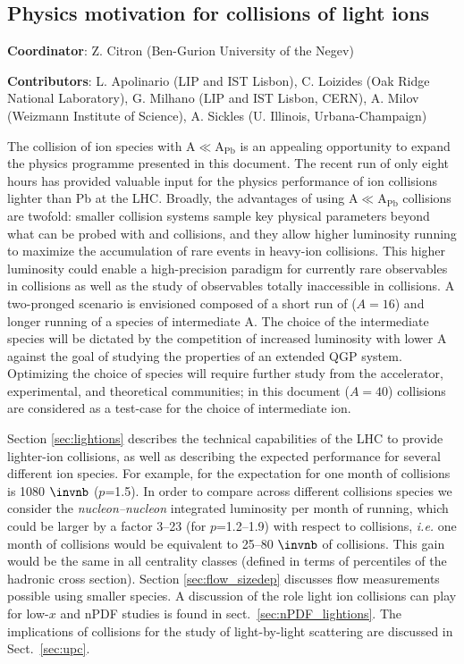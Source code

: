 \subsection{Physics motivation for collisions of light ions}
\label{sec:smallAsum}
{ \small
\noindent \textbf{Coordinator}: Z. Citron (Ben-Gurion University of the Negev)

\noindent \textbf{Contributors}:
L. Apolinario (LIP and IST Lisbon),
C. Loizides (Oak Ridge National Laboratory),
G. Milhano (LIP and IST Lisbon, CERN),
A. Milov (Weizmann Institute of Science),
A. Sickles (U. Illinois, Urbana-Champaign)
}

The collision of ion species with A$\ll$A$_\mathrm{Pb}$ is an appealing opportunity to expand the physics programme presented in this document.  The recent \XeXe run of only eight hours has provided valuable input for the physics performance of ion collisions lighter than Pb at the LHC.  Broadly, the advantages of using A$\ll$A$_\mathrm{Pb}$  collisions are twofold: smaller collision systems sample key physical parameters beyond what can be probed with \PbPb and \pPb collisions, and they allow higher luminosity running to maximize the accumulation of rare events in heavy-ion collisions.  This higher luminosity could enable a high-precision paradigm for currently rare observables in \PbPb collisions as well as the study of observables totally inaccessible in \PbPb collisions.        
A two-pronged scenario is envisioned composed of a short run of \OO  ($A=16$) and longer running of a species of intermediate A.  The choice of the intermediate species will be dictated by the competition of increased luminosity with lower A against the goal of studying the properties of an extended QGP system. Optimizing the choice of species will require further study from the accelerator, experimental, and theoretical communities; in this document \ArAr ($A=40$) collisions are considered as a test-case for the choice of intermediate ion.

Section \ref{sec:lightions} describes the technical capabilities of the LHC to provide lighter-ion collisions, as well as describing the expected performance for several different ion species.
For example, for \ArAr the expectation for one month of collisions is 1080 $\invnb$ ($p$=1.5).  In order to compare across different collisions species we consider the \textit{nucleon--nucleon} integrated luminosity per month of running, which could be larger by a factor 3--23 (for $p$=1.2--1.9) with respect to \PbPb collisions, \textit{i.e.} one month of \ArAr collisions would be equivalent to 25--80 $\invnb$ of \PbPb collisions. This gain would be the same in all centrality classes (defined in terms of percentiles of the hadronic cross section).
Section \ref{sec:flow_sizedep} discusses flow measurements possible using smaller species.  A discussion of the role light ion collisions can play for low-$x$ and nPDF studies is found in sect.~\ref{sec:nPDF_lightions}.  The implications of \ArAr collisions for the study of light-by-light scattering are discussed in Sect.~\ref{sec:upc}. 

